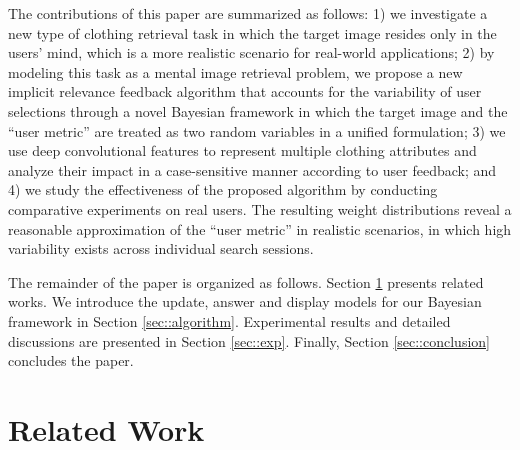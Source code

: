 \documentclass[journal]{IEEEtran}
\begin{document}
The contributions of this paper are summarized as follows: 1) we investigate a new type of clothing retrieval task in which the target image resides only in the users' mind, which is a more realistic scenario for real-world applications; 2) by modeling this task as a mental image retrieval problem, we propose a new implicit relevance feedback algorithm that accounts for the variability of user selections through a novel Bayesian framework in which the target image and the ``user metric'' are treated as two random variables in a unified formulation; 3) we use deep convolutional features to represent multiple clothing attributes and analyze their impact in a case-sensitive manner according to user feedback; and 4) we study the effectiveness of the proposed algorithm by conducting comparative experiments on real users. The resulting weight distributions reveal a reasonable approximation of the ``user metric'' in realistic scenarios, in which high variability exists across individual search sessions.

The remainder of the paper is organized as follows. Section \ref{sec::relatedwork} presents related works. We introduce the update, answer and display models for our Bayesian framework in Section \ref{sec::algorithm}. Experimental results and detailed discussions are presented in Section \ref{sec::exp}. Finally, Section \ref{sec::conclusion} concludes the paper.









\section{Related Work}
\label{sec::relatedwork}
\end{document}
